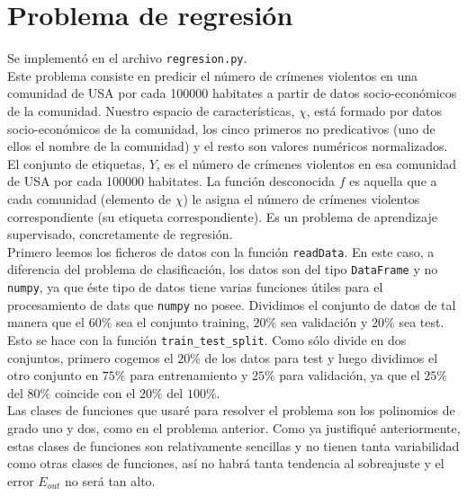 \documentclass{article}
\begin{document}
\newpage
\section{Problema de regresión}

Se implementó en el archivo \texttt{regresion.py}.\\

Este problema consiste en predicir el número de crímenes violentos en una comunidad de USA por cada 100000 habitates a partir de datos socio-económicos de la comunidad. Nuestro espacio de características, $\chi$, está formado por datos socio-económicos de la comunidad, los cinco primeros no predicativos (uno de ellos el nombre de la comunidad) y el resto son valores numéricos normalizados. El conjunto de etiquetas, $Y$, es el número de crímenes violentos en esa comunidad de USA por cada 100000 habitates. La función desconocida $f$ es aquella que a cada comunidad (elemento de $\chi$) le asigna el número de crímenes violentos correspondiente (su etiqueta correspondiente). Es un problema de aprendizaje supervisado, concretamente de regresión.\\

Primero leemos los ficheros de datos con la función \texttt{readData}. En este caso, a diferencia del problema de clasificación, los datos son del tipo \texttt{DataFrame} y no \texttt{numpy}, ya que éste tipo de datos tiene varias funciones útiles para el procesamiento de dats que \texttt{numpy} no posee. Dividimos el conjunto de datos de tal manera que el $60\%$ sea el conjunto training, $20\%$ sea validación y $20\%$ sea test. Esto se hace con la función \texttt{train\_test\_split}. Como sólo divide en dos conjuntos, primero cogemos el $20\%$ de los datos para test y luego dividimos el otro conjunto en $75\%$ para entrenamiento y $25\%$ para validación, ya que el $25\%$ del $80\%$ coincide con el $20\%$ del $100\%$.\\

Las clases de funciones que usaré para resolver el problema son los polinomios de grado uno y dos, como en el problema anterior. Como ya justifiqué anteriormente, estas clases de funciones son relativamente sencillas y no tienen tanta variabilidad como otras clases de funciones, así no habrá tanta tendencia al sobreajuste y el error $E_{out}$ no será tan alto.\\
\end{document}
